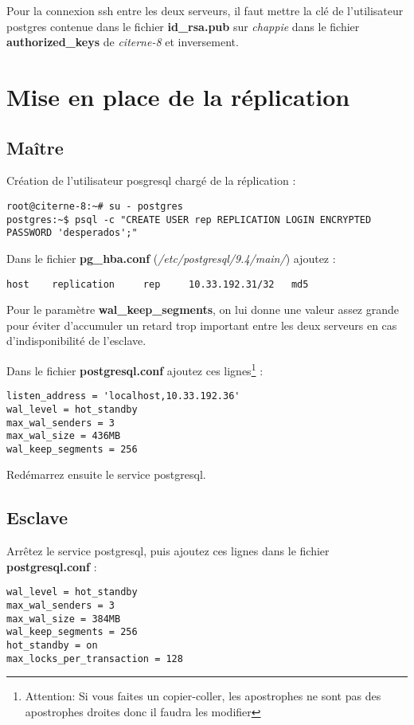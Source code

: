 Pour la connexion ssh entre les deux serveurs, il faut mettre la clé de l'utilisateur postgres contenue dans le fichier \textbf{id\_rsa.pub} sur \textit{chappie} dans le fichier \textbf{authorized\_keys} de \textit{citerne-8} et inversement.

\section{Mise en place de la réplication}

\subsection{ Maître}

Création de l'utilisateur posgresql chargé de la réplication :
\begin{lstlisting}
root@citerne-8:~# su - postgres
postgres:~$ psql -c "CREATE USER rep REPLICATION LOGIN ENCRYPTED PASSWORD 'desperados';"
\end{lstlisting}

Dans le fichier \textbf{pg\_hba.conf} (\textit{/etc/postgresql/9.4/main/}) ajoutez :
\begin{lstlisting}
host    replication     rep     10.33.192.31/32   md5
\end{lstlisting}

Pour le paramètre \textbf{wal\_keep\_segments}, on lui donne une valeur assez grande pour éviter d'accumuler un retard trop important entre les deux serveurs en cas d'indisponibilité de l'esclave.

Dans le fichier \textbf{postgresql.conf} ajoutez ces lignes\footnote{Attention: Si vous faites un copier-coller, les apostrophes ne sont pas des apostrophes droites donc il faudra les modifier} :

\begin{lstlisting}
listen_address = 'localhost,10.33.192.36' 
wal_level = hot_standby 
max_wal_senders = 3 
max_wal_size = 436MB 
wal_keep_segments = 256 
\end{lstlisting}

Redémarrez ensuite le service postgresql.

\subsection{Esclave}
\label{esclave}
Arrêtez le service postgresql, puis ajoutez ces lignes dans le fichier \textbf{postgresql.conf} :
\begin{lstlisting}
wal_level = hot_standby
max_wal_senders = 3
max_wal_size = 384MB
wal_keep_segments = 256
hot_standby = on
max_locks_per_transaction = 128
\end{lstlisting}

